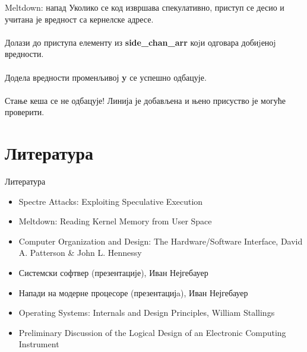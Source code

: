 \documentclass[xcolor=table]{beamer}
\begin{document}
\begin{frame}{Meltdown: напад}
        Уколико се код извршава спекулативно, приступ се десио и учитана је вредност са кернелске адресе.
        \\~\\
        Долази до приступа елементу из \textbf{side\_chan\_arr} коjи одговара добиjеноj вредности.
        \\~\\
        Додела вредности променљивој \textbf{y} се успешно одбацује.
        \\~\\
        Стање кеша се не одбацује! Линија је добављена и њено присуство је могуће проверити.
    \end{frame}
    
    \section{Литература}
    
    \begin{frame}{Литература}
        \begin{itemize}
            \item Spectre Attacks: Exploiting Speculative Execution
            \item Meltdown: Reading Kernel Memory from User Space
            \item Computer Organization and Design: The Hardware/Software Interface, David A. Patterson \& John L. Hennessy
            \item Системски софтвер (презентације), Иван Нејгебауер
            \item Напади на модерне процесоре (презентацијa), Иван Нејгебауер
            \item Operating Systems: Internals and Design Principles, William Stallings
            \item Preliminary Discussion of the Logical Design of an Electronic Computing Instrument
        \end{itemize}
    \end{frame}
\end{document}
